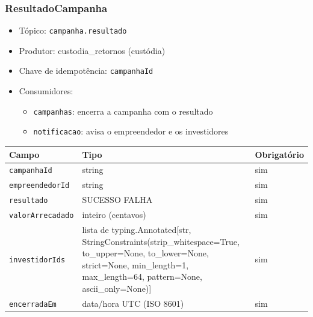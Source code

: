 \subsubsection{ResultadoCampanha}
\begin{itemize}
  \item Tópico: \texttt{campanha.resultado}
  \item Produtor: custodia\_retornos (custódia)
  \item Chave de idempotência: \texttt{campanhaId}
  \item Consumidores:
  \begin{itemize}
    \item \texttt{campanhas}: encerra a campanha com o resultado
    \item \texttt{notificacao}: avisa o empreendedor e os investidores
  \end{itemize}
\end{itemize}
\begin{tabular}{lll}
\hline
Campo & Tipo & Obrigatório \\
\hline
\texttt{campanhaId} & string & sim \\
\texttt{empreendedorId} & string & sim \\
\texttt{resultado} & SUCESSO \textbar{} FALHA & sim \\
\texttt{valorArrecadado} & inteiro (centavos) & sim \\
\texttt{investidorIds} & lista de typing.Annotated[str, StringConstraints(strip\_whitespace=True, to\_upper=None, to\_lower=None, strict=None, min\_length=1, max\_length=64, pattern=None, ascii\_only=None)] & sim \\
\texttt{encerradaEm} & data/hora UTC (ISO 8601) & sim \\
\hline
\end{tabular}

